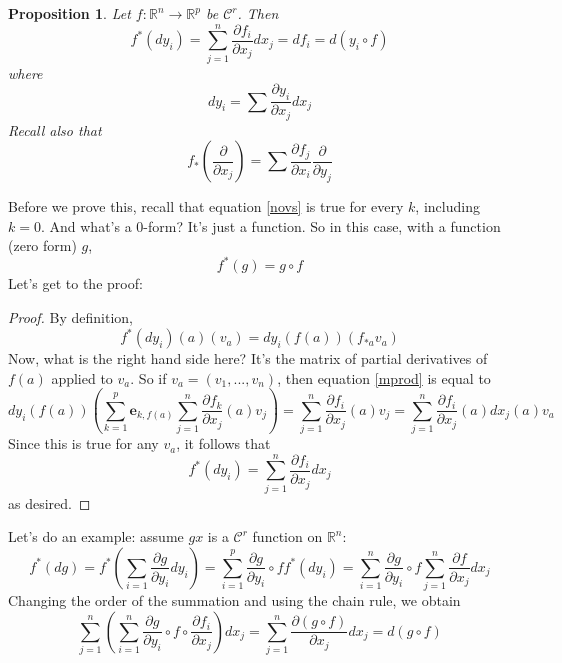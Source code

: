 \documentclass{article}
\newtheorem{proposition}{Proposition}
\newcommand{\reals}[0]{\mathbb{R}}
\newcommand{\mc}[1]{\mathcal{#1}}
\newcommand{\prt}[2]{\frac{\partial #1}{\partial #2}}
\newcommand{\mb}[1]{\mathbf{#1}}
\begin{document}
\begin{proposition}
  Let \(f: \reals^n \to \reals^p\) be \(\mc{C}^r\). Then
  \begin{equation}
    f^*(dy_i) = \sum_{j = 1}^n\prt{f_i}{x_j}dx_j = df_i = d(y_i \circ f)
  \end{equation}
  where
  \begin{equation}
    dy_i = \sum\prt{y_i}{x_j}dx_j
  \end{equation}
  Recall also that
  \begin{equation}
    f_*\left(\prt{}{x_j}\right) = \sum\prt{f_j}{x_i}\prt{}{y_j}
  \end{equation}
\end{proposition}
Before we prove this, recall that equation \ref{novs} is true for every \(k\), including \(k = 0\). And what's a 0-form? It's just a function. So in this case, with a function (zero form) \(g\),
\begin{equation}
  f^*(g) = g \circ f
\end{equation}
Let's get to the proof:
\begin{proof}
  By definition,
  \begin{equation}
    f^*(dy_i)(a)(v_a) = dy_i(f(a))(f_{*a}v_a)
    \label{mprod}
  \end{equation}
  Now, what is the right hand side here? It's the matrix of partial derivatives of \(f(a)\) applied to \(v_a\). So if \(v_a = (v_1,...,v_n)\), then equation \ref{mprod} is equal to
  \begin{equation}
    dy_i(f(a))\left(\sum_{k = 1}^p\mb{e}_{k, f(a)}
      \sum_{j = 1}^n\prt{f_k}{x_j}(a)v_j\right)
      = \sum_{j = 1}^n\prt{f_i}{x_j}(a)v_j
      = \sum_{j = 1}^n\prt{f_i}{x_j}(a)dx_j(a)v_a
  \end{equation}
  Since this is true for any \(v_a\), it follows that
  \begin{equation}
    f^*(dy_i) = \sum_{j = 1}^n\prt{f_i}{x_j}dx_j
  \end{equation}
  as desired.
\end{proof}
Let's do an example: assume \(gx\) is a \(\mc{C}^r\) function on \(\reals^n\):
\begin{equation}
  f^*(dg) = f^*\left(\sum_{i = 1}\prt{g}{y_i}dy_i\right) = \sum_{i = 1}^p\prt{g}{y_i} \circ ff^*(dy_i) = \sum_{i = 1}^n\prt{g}{y_i} \circ f\sum_{j = 1}^n\prt{f}{x_j}dx_j
\end{equation}
Changing the order of the summation and using the chain rule, we obtain
\begin{equation}
  \sum_{j = 1}^n\left(\sum_{i = 1}^n\prt{g}{y_i}\circ f \circ \prt{f_i}{x_j}\right)dx_j = \sum_{j = 1}^n\prt{(g \circ f)}{x_j}dx_j = d(g \circ f)
\end{equation}
\end{document}
